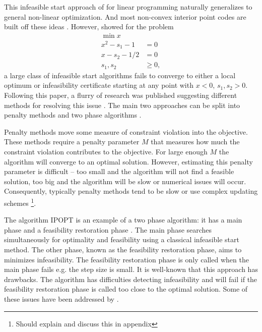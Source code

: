 \documentclass{article}
\begin{document}

This infeasible start approach of \cite{lustig1990feasibility} for linear programming naturally generalizes to general non-linear optimization. 
And most non-convex interior point codes are built off these ideas \cite{vanderbei1999loqo,wachter2006implementation,byrd2006knitro}. However, \cite{wachter2000failure} showed for the problem
\begin{subequations}\label{failure-ex}
\begin{flalign}
\min { x }\\
x^2 - s_1 - 1 &= 0 \\
x - s_2 - 1/2 &= 0 \\
s_1, s_2 &\ge 0,
\end{flalign}
\end{subequations}
a large class of infeasible start algorithms fails to converge to either a local optimum or infeasibility certificate starting at any point with $x < 0$, $s_{1}, s_{2} > 0$. Following this paper, a flurry of research was published suggesting different methods for resolving this issue \cite{benson2004interior}. The main two approaches can be split into penalty methods \cite{liu2004robust, chen2006interior,curtis2012penalty,gould2015interior} and two phase algorithms \cite{wachter2006implementation}. 

Penalty methods move some measure of constraint violation into the objective. These methods require a penalty parameter $M$ that measures how much the constraint violation contributes to the objective. For large enough $M$ the algorithm will converge to an optimal solution. However, estimating this penalty parameter is difficult -- too small and the algorithm will not find a feasible solution, too big and the algorithm will be slow or numerical issues will occur. Consequently, typically penalty methods tend to be slow \cite[Algorithm 1]{curtis2012penalty} or use complex updating schemes \cite[Algorithm 2]{curtis2012penalty}\footnote{Should explain and discuss this in appendix}. 

The algorithm IPOPT is an example of a two phase algorithm: it has a main phase and a feasibility restoration phase  \cite{wachter2006implementation}. The main phase searches simultaneously for optimality and feasibility using a classical infeasible start method. The other phase, known as the feasibility restoration phase, aims to minimizes infeasibility. The feasibility restoration phase is only called when the main phase fails e.g. the step size is small. It is well-known that this approach has drawbacks. The algorithm has difficulties detecting infeasibility \cite[Table 15]{huang2016solution} and will fail if the feasibility restoration phase is called too close to the optimal solution. Some of these issues have been addressed by \cite{nocedal2014interior}. 
\end{document}
